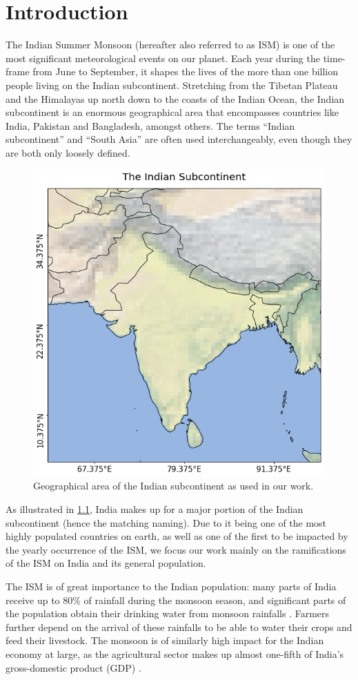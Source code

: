 \chapter{Introduction}
\label{c:introduction}

The Indian Summer Monsoon (hereafter also referred to as ISM) is one of the most significant meteorological events on our planet. Each year during the time-frame from June to September, it shapes the lives of the more than one billion people living on the Indian subcontinent. Stretching from the Tibetan Plateau and the Himalayas up north down to the coasts of the Indian Ocean, the Indian subcontinent is an enormous geographical area that encompasses countries like India, Pakistan and Bangladesh, amongst others. The terms ``Indian subcontinent'' and ``South Asia'' are often used interchangeably, even though they are both only loosely defined.

\begin{figure}[h]
  \centering
  \includegraphics[width=0.3\linewidth]{./99_appendix/img/area_overview}
  \caption{Geographical area of the Indian subcontinent as used in our work.}
  \label{fig:the_indian_subcontinent}
\end{figure}

As illustrated in \cref{fig:the_indian_subcontinent}, India makes up for a major portion of the Indian subcontinent (hence the matching naming). Due to it being one of the most highly populated countries on earth, as well as one of the first to be impacted by the yearly occurrence of the ISM, we focus our work mainly on the ramifications of the ISM on India and its general population.

The ISM is of great importance to the Indian population: many parts of India receive up to 80\% of rainfall during the monsoon season, and significant parts of the population obtain their drinking water from monsoon rainfalls \citep{Stolbova.2015}. Farmers further depend on the arrival of these rainfalls to be able to water their crops and feed their livestock. The monsoon is of similarly high impact for the Indian economy at large, as the agricultural sector makes up almost one-fifth of India's gross-domestic product (GDP) \citep{CentralIntelligenceAgency.05.01.2018}.

